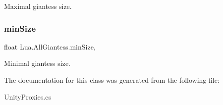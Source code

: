 Maximal giantess size. 

\mbox{\label{class_lua_1_1_all_giantess_a4852dd60230117796328807f41509dbf}} 
\subsubsection{\texorpdfstring{minSize}{minSize}}
{\footnotesize\ttfamily float Lua.\+All\+Giantess.\+min\+Size\hspace{0.3cm}{\ttfamily [get]}, {\ttfamily [set]}}



Minimal giantess size. 



The documentation for this class was generated from the following file\+:\begin{DoxyCompactItemize}
\item 
Unity\+Proxies.\+cs\end{DoxyCompactItemize}
